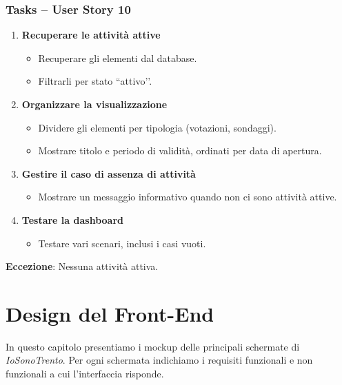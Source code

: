 \documentclass{article}
\begin{document}
\subsubsection{Tasks -- User Story 10}
\begin{enumerate}
    \item \textbf{Recuperare le attività attive}
    \begin{itemize}
        \item Recuperare gli elementi dal database.
        \item Filtrarli per stato ``attivo’’.
    \end{itemize}

    \item \textbf{Organizzare la visualizzazione}
    \begin{itemize}
        \item Dividere gli elementi per tipologia (votazioni, sondaggi).
        \item Mostrare titolo e periodo di validità, ordinati per data di apertura.
    \end{itemize}

    \item \textbf{Gestire il caso di assenza di attività}
    \begin{itemize}
        \item Mostrare un messaggio informativo quando non ci sono attività attive.
    \end{itemize}

    \item \textbf{Testare la dashboard}
    \begin{itemize}
        \item Testare vari scenari, inclusi i casi vuoti.
    \end{itemize}
\end{enumerate}


\textbf{Eccezione}: Nessuna attività attiva.


\section{Design del Front-End}

In questo capitolo presentiamo i mockup delle principali schermate di \textit{IoSonoTrento}. Per ogni schermata indichiamo i requisiti funzionali e non funzionali a cui l'interfaccia risponde.

\end{document}
